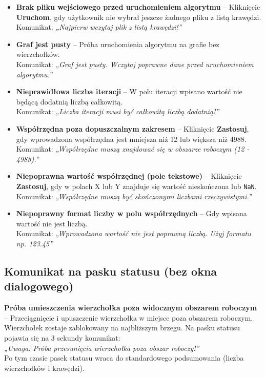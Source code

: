 \documentclass[a4paper, 11pt]{article}
\begin{document}
\begin{itemize}
  \item \textbf{Brak pliku wejściowego przed uruchomieniem algorytmu} – Kliknięcie \textbf{Uruchom}, gdy użytkownik nie wybrał jeszcze żadnego pliku z listą krawędzi.\\
  Komunikat: \textit{„Najpierw wczytaj plik z listą krawędzi!”}

  \item \textbf{Graf jest pusty} – Próba uruchomienia algorytmu na grafie bez wierzchołków.\\
  Komunikat: \textit{„Graf jest pusty. Wczytaj poprawne dane przed uruchomieniem algorytmu.”}

  \item \textbf{Nieprawidłowa liczba iteracji} – W polu iteracji wpisano wartość nie będącą dodatnią liczbą całkowitą.\\
  Komunikat: \textit{„Liczba iteracji musi być całkowitą liczbą dodatnią!”}

  \item \textbf{Współrzędna poza dopuszczalnym zakresem} – Kliknięcie \textbf{Zastosuj}, gdy wprowadzona współrzędna jest mniejsza niż 12 lub większa niż 4988.\\
  Komunikat: \textit{„Współrzędne muszą znajdować się w obszarze roboczym (12 - 4988).”}

  \item \textbf{Niepoprawna wartość współrzędnej (pole tekstowe)} – Kliknięcie \textbf{Zastosuj}, gdy w polach X lub Y znajduje się wartość nieskończona lub \texttt{NaN}.\\
  Komunikat: \textit{„Współrzędne muszą być skończonymi liczbami rzeczywistymi.”}

  \item \textbf{Niepoprawny format liczby w polu współrzędnych} – Gdy wpisana wartość nie jest liczbą.\\
  Komunikat: \textit{„Wprowadzona wartość nie jest poprawną liczbą. Użyj formatu np. 123.45”}
\end{itemize}

\subsection*{Komunikat na pasku statusu (bez okna dialogowego)}

\textbf{Próba umieszczenia wierzchołka poza widocznym obszarem roboczym} – Przeciągnięcie i upuszczenie wierzchołka w miejsce poza obszarem roboczym. Wierzchołek zostaje zablokowany na najbliższym brzegu. Na pasku statusu pojawia się na 3 sekundy komunikat: \\
\textit{„Uwaga: Próba przesunięcia wierzchołka poza obszar roboczy!”} \\
Po tym czasie pasek statusu wraca do standardowego podsumowania (liczba wierzchołków i krawędzi).
\end{document}

